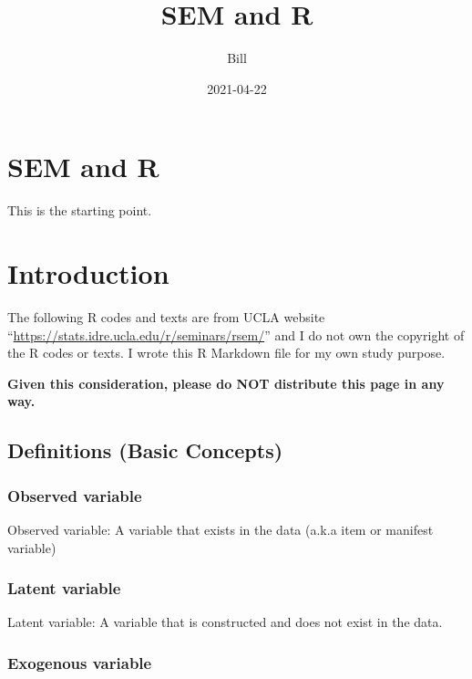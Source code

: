 \documentclass[]{book}
\title{SEM and R}
\author{Bill}
\date{2021-04-22}
\begin{document}
\maketitle

{
\setcounter{tocdepth}{1}
\tableofcontents
}
\hypertarget{sem-and-r}{%
\chapter{SEM and R}\label{sem-and-r}}

This is the starting point.

\hypertarget{intro}{%
\chapter{Introduction}\label{intro}}

The following R codes and texts are from UCLA website ``\url{https://stats.idre.ucla.edu/r/seminars/rsem/}'' and I do not own the copyright of the R codes or texts. I wrote this R Markdown file for my own study purpose.

\textbf{Given this consideration, please do NOT distribute this page in any way.}

\hypertarget{definitions-basic-concepts}{%
\section{Definitions (Basic Concepts)}\label{definitions-basic-concepts}}

\hypertarget{observed-variable}{%
\subsection{Observed variable}\label{observed-variable}}

Observed variable: A variable that exists in the data (a.k.a item or manifest variable)

\hypertarget{latent-variable}{%
\subsection{Latent variable}\label{latent-variable}}

Latent variable: A variable that is constructed and does not exist in the data.

\hypertarget{exogenous-variable}{%
\subsection{Exogenous variable}\label{exogenous-variable}}
\end{document}
